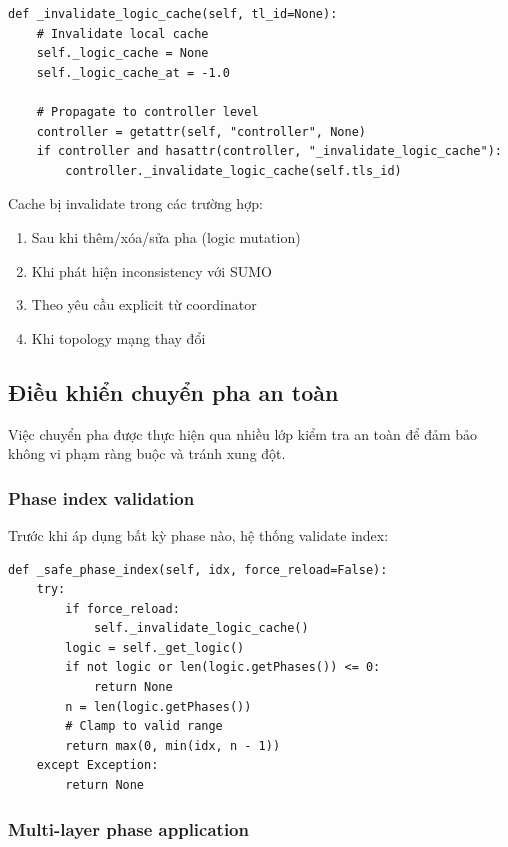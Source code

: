 \documentclass[12pt,a4paper,oneside]{report}
\begin{document}
\begin{lstlisting}[style=py, caption={Cache invalidation mechanism}]
def _invalidate_logic_cache(self, tl_id=None):
    # Invalidate local cache
    self._logic_cache = None
    self._logic_cache_at = -1.0
    
    # Propagate to controller level
    controller = getattr(self, "controller", None)
    if controller and hasattr(controller, "_invalidate_logic_cache"):
        controller._invalidate_logic_cache(self.tls_id)
\end{lstlisting}
Cache bị invalidate trong các trường hợp:
\begin{enumerate}
    \item Sau khi thêm/xóa/sửa pha (logic mutation)
    \item Khi phát hiện inconsistency với SUMO
    \item Theo yêu cầu explicit từ coordinator
    \item Khi topology mạng thay đổi
\end{enumerate}

\subsection{Điều khiển chuyển pha an toàn}

Việc chuyển pha được thực hiện qua nhiều lớp kiểm tra an toàn để đảm bảo không vi phạm ràng buộc và tránh xung đột.

\subsubsection{Phase index validation}

Trước khi áp dụng bất kỳ phase nào, hệ thống validate index:

\begin{lstlisting}[style=py, caption={Safe phase index clamping}]
def _safe_phase_index(self, idx, force_reload=False):
    try:
        if force_reload:
            self._invalidate_logic_cache()
        logic = self._get_logic()
        if not logic or len(logic.getPhases()) <= 0:
            return None
        n = len(logic.getPhases())
        # Clamp to valid range
        return max(0, min(idx, n - 1))
    except Exception:
        return None
\end{lstlisting}

\subsubsection{Multi-layer phase application}
\end{document}
